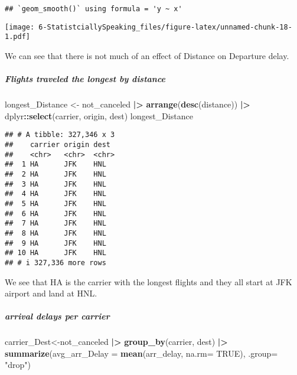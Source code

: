 \documentclass[
]{article}
\newenvironment{Shaded}{\begin{snugshade}}{\end{snugshade}}
\newcommand{\AttributeTok}[1]{\textcolor[rgb]{0.13,0.29,0.53}{#1}}
\newcommand{\ConstantTok}[1]{\textcolor[rgb]{0.56,0.35,0.01}{#1}}
\newcommand{\FunctionTok}[1]{\textcolor[rgb]{0.13,0.29,0.53}{\textbf{#1}}}
\newcommand{\NormalTok}[1]{#1}
\newcommand{\OtherTok}[1]{\textcolor[rgb]{0.56,0.35,0.01}{#1}}
\newcommand{\SpecialCharTok}[1]{\textcolor[rgb]{0.81,0.36,0.00}{\textbf{#1}}}
\newcommand{\StringTok}[1]{\textcolor[rgb]{0.31,0.60,0.02}{#1}}
\begin{document}
\begin{verbatim}
## `geom_smooth()` using formula = 'y ~ x'
\end{verbatim}

\texttt{[image: 6-StatistciallySpeaking\_files/figure-latex/unnamed-chunk-18-1.pdf]}

We can see that there is not much of an effect of Distance on Departure
delay.

\subparagraph{Flights traveled the longest by
distance}\label{flights-traveled-the-longest-by-distance}

\begin{Shaded}
\begin{Highlighting}[]
\NormalTok{longest\_Distance }\OtherTok{\textless{}{-}}\NormalTok{ not\_canceled }\SpecialCharTok{|\textgreater{}}
  \FunctionTok{arrange}\NormalTok{(}\FunctionTok{desc}\NormalTok{(distance)) }\SpecialCharTok{|\textgreater{}}
\NormalTok{  dplyr}\SpecialCharTok{::}\FunctionTok{select}\NormalTok{(carrier, origin, dest)}
\NormalTok{longest\_Distance}
\end{Highlighting}
\end{Shaded}

\begin{verbatim}
## # A tibble: 327,346 x 3
##    carrier origin dest 
##    <chr>   <chr>  <chr>
##  1 HA      JFK    HNL  
##  2 HA      JFK    HNL  
##  3 HA      JFK    HNL  
##  4 HA      JFK    HNL  
##  5 HA      JFK    HNL  
##  6 HA      JFK    HNL  
##  7 HA      JFK    HNL  
##  8 HA      JFK    HNL  
##  9 HA      JFK    HNL  
## 10 HA      JFK    HNL  
## # i 327,336 more rows
\end{verbatim}

We see that HA is the carrier with the longest flights and they all
start at JFK airport and land at HNL.

\subparagraph{arrival delays per
carrier}\label{arrival-delays-per-carrier}

\begin{Shaded}
\begin{Highlighting}[]
\NormalTok{carrier\_Dest}\OtherTok{\textless{}{-}}\NormalTok{not\_canceled }\SpecialCharTok{|\textgreater{}}
  \FunctionTok{group\_by}\NormalTok{(carrier, dest) }\SpecialCharTok{|\textgreater{}}
  \FunctionTok{summarize}\NormalTok{(}\AttributeTok{avg\_arr\_Delay =} \FunctionTok{mean}\NormalTok{(arr\_delay, }\AttributeTok{na.rm=} \ConstantTok{TRUE}\NormalTok{), }\AttributeTok{.group=} \StringTok{"drop"}\NormalTok{)}
\end{Highlighting}
\end{Shaded}
\end{document}
